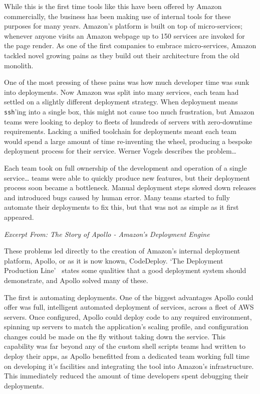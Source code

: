 \documentclass[11pt]{article}
\begin{document}
While this is the first time tools like this have been offered by Amazon
commercially, the business has been making use of internal tools for these
purposes for many years. Amazon's platform is built on top of micro-services;
whenever anyone visits an Amazon webpage up to 150 services are invoked for the
page render. As one of the first companies to embrace micro-services, Amazon
tackled novel growing pains as they build out their architecture from the old
monolith.

One of the most pressing of these pains was how much developer time was sunk
into deployments. Now Amazon was split into many services, each team had settled
on a slightly different deployment strategy. When deployment means
\texttt{ssh}'ing into a single box, this might not cause too much frustration,
but Amazon teams were looking to deploy to fleets of hundreds of servers with
zero-downtime requirements. Lacking a unified toolchain for deployments meant
each team would spend a large amount of time re-inventing the wheel, producing a
bespoke deployment process for their service. Werner Vogels describes the
problem\dots

\begin{displayquote}
Each team took on full ownership of the development and operation of a
single service… teams were able to quickly produce new features, but their
deployment process soon became a bottleneck. Manual deployment steps slowed down
releases and introduced bugs caused by human error. Many teams started to fully
automate their deployments to fix this, but that was not as simple as it first
appeared.

\textit{Excerpt From: The Story of Apollo - Amazon's Deployment
Engine~\cite{theStoryOfApollo}}
\end{displayquote}

These problems led directly to the creation of Amazon's internal deployment
platform, Apollo, or as it is now known, CodeDeploy. `The Deployment Production
Line'~\cite{deploymentProductionLine} states some qualities that a good
deployment system should demonstrate, and Apollo solved many of these.

The first is automating deployments. One of the biggest advantages Apollo could
offer was full, intelligent automated deployment of services, across a fleet of
AWS servers. Once configured, Apollo could deploy code to any required
environment, spinning up servers to match the application's scaling profile, and
configuration changes could be made on the fly without taking down the service.
This capability was far beyond any of the custom shell scripts teams had written
to deploy their apps, as Apollo benefitted from a dedicated team working full
time on developing it's facilities and integrating the tool into Amazon's
infrastructure. This immediately reduced the amount of time developers spent
debugging their deployments.
\end{document}
